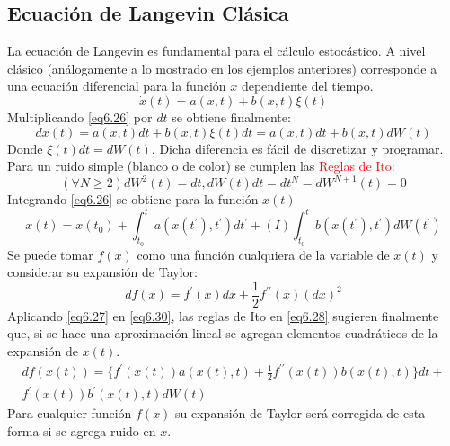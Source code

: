 \documentclass{book}
\begin{document}
\subsection{Ecuación de Langevin Clásica}
La ecuación de Langevin es fundamental para el cálculo estocástico. A nivel clásico (análogamente a lo mostrado en los ejemplos anteriores) corresponde a una ecuación diferencial para la función $x$ dependiente del tiempo.
\begin{equation}\label{eq6.26}\dot{x}(t)=a(x,t)+b(x,t)\xi(t)\end{equation}
Multiplicando \ref{eq6.26} por $dt$ se obtiene finalmente:
\begin{equation}\label{eq6.27}dx(t)=a(x,t)dt+b(x,t)\xi(t)dt=a(x,t)dt+b(x,t)dW(t)\end{equation}
Donde $\xi(t)dt=dW(t)$. Dicha diferencia es fácil de discretizar y programar. Para un ruido simple (blanco o de color) se cumplen las \textcolor{red}{Reglas de Ito}:
\begin{equation}\label{eq6.28}(\forall N\geq 2)dW^2(t)=dt, dW(t)dt=dt^N=dW^{N+1}(t)=0 \end{equation}
Integrando \ref{eq6.26} se obtiene para la función $x(t)$
\begin{equation}\label{eq6.29}x(t)=x(t_0)+\int_{t_0}^t a(x(t^\prime),t^\prime) dt^\prime +(I)\int_{t_0}^t b(x(t^\prime),t^\prime)dW(t^\prime)\end{equation}
Se puede tomar $f(x)$ como una función cualquiera de la variable de $x(t)$ y considerar su expansión de Taylor:
\begin{equation}\label{eq6.30}df(x)=f^\prime(x)dx+\frac{1}{2}f^{\prime\prime}(x)(dx)^2\end{equation}
Aplicando \ref{eq6.27} en \ref{eq6.30}, las reglas de Ito en \ref{eq6.28} sugieren finalmente que, si se hace una aproximación lineal se agregan elementos cuadráticos de la expansión de $x(t)$.
\begin{equation}\begin{aligned}\label{eq6.31}df(x(t))=\{f^\prime(x(t))a(x(t),t)+\frac{1}{2}f^{\prime\prime}(x(t))b(x(t),t)\}dt+ \\f^\prime(x(t))b^\prime(x(t),t)dW(t)\end{aligned}\end{equation}
Para cualquier función $f(x)$ su expansión de Taylor será corregida de esta forma si se agrega ruido en $x$.
\end{document}
